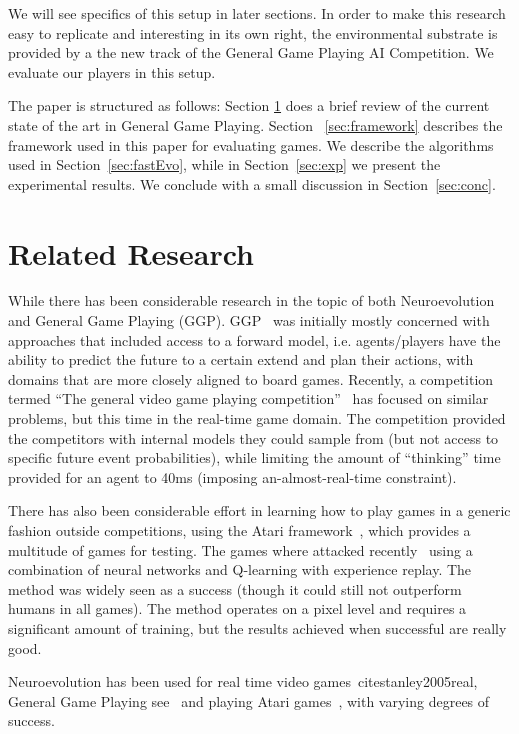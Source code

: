 \documentclass[conference]{IEEEtran}
\begin{document}
We will see specifics of this setup in later sections. In order to make this research easy to replicate and interesting in its own right, the environmental substrate is provided by a the new track of the General Game Playing AI Competition. We evaluate our players in this setup. 

The paper is structured as follows: Section \ref{sec:lit} does a brief review of the current state of the art in General Game Playing. Section ~\ref{sec:framework} describes the framework used in this paper for evaluating games. We describe the algorithms used in Section~\ref{sec:fastEvo}, while in Section~\ref{sec:exp} we present the experimental results. We conclude with a small discussion in Section~\ref{sec:conc}. 
 
\section{Related Research} \label{sec:lit}
While there has been considerable research in the topic of both Neuroevolution and General Game Playing (GGP). GGP~\cite{genesereth2005general} was initially mostly concerned with approaches that included access to a forward model, i.e. agents/players have the ability to predict the future to a certain extend and plan their actions, with domains that are more closely aligned to board games. Recently, a competition termed ``The general video game playing competition''~\cite{Perez2015} has focused on similar problems, but this time in the real-time game domain. The competition provided the competitors with internal models they could sample from (but not access to specific future event probabilities), while limiting the amount of ``thinking'' time provided for an agent to 40ms (imposing an-almost-real-time constraint). 

There has also been considerable effort in learning how to play games in a generic fashion outside competitions,  using the Atari framework~\cite{13jair-ale}, which provides a multitude of games for testing. The games where attacked recently~\cite{mnih2015human} using a combination of neural networks and Q-learning with experience replay. The method was widely seen as a success (though it could still not outperform humans in all games). The method operates on a pixel level and requires a significant amount of training, but the results achieved when successful are really good. 

Neuroevolution has been used for real time video games~cite{stanley2005real},  General Game Playing see~\cite{reisinger2007coevolving} and playing Atari games~\cite{hausknecht2012hyperneat}, with varying degrees of success.
\end{document}

